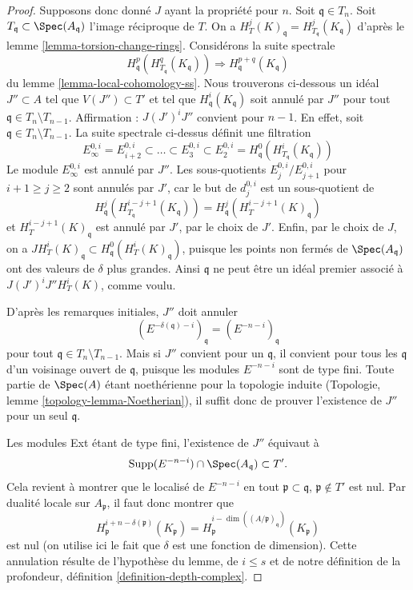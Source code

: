 \begin{proof}
\medskip\noindent
Supposons donc donné $J$ ayant la propriété pour $n$. Soit $\mathfrak q \in T_n$. Soit $T_\mathfrak q \subset \Spec(A_\mathfrak q)$ l'image réciproque de $T$. On a $H^j_T(K)_\mathfrak q = H^j_{T_\mathfrak q}(K_\mathfrak q)$ d'après le lemme \ref{lemma-torsion-change-rings}. Considérons la suite spectrale
$$
H_\mathfrak q^p(H^q_{T_\mathfrak q}(K_\mathfrak q))
\Rightarrow
H^{p + q}_\mathfrak q(K_\mathfrak q)
$$
du lemme \ref{lemma-local-cohomology-ss}. Nous trouverons ci-dessous un idéal $J'' \subset A$ tel que $V(J'') \subset T'$ et tel que $H^i_\mathfrak q(K_\mathfrak q)$ soit annulé par $J''$ pour tout $\mathfrak q \in T_n \setminus T_{n - 1}$. Affirmation : $J (J')^i J''$ convient pour $n - 1$. En effet, soit $\mathfrak q \in T_n \setminus T_{n - 1}$. La suite spectrale ci-dessus définit une filtration
$$
E_\infty^{0, i} = E_{i + 2}^{0, i} \subset \ldots \subset E_3^{0, i} \subset
E_2^{0, i} = H^0_\mathfrak q(H^i_{T_\mathfrak q}(K_\mathfrak q))
$$
Le module $E_\infty^{0, i}$ est annulé par $J''$. Les sous-quotients $E_j^{0, i}/E_{j + 1}^{0, i}$ pour $i + 1 \geq j \geq 2$ sont annulés par $J'$, car le but de $d_j^{0, i}$ est un sous-quotient de
$$
H^j_\mathfrak q(H^{i - j + 1}_{T_\mathfrak q}(K_\mathfrak q)) =
H^j_\mathfrak q(H^{i - j + 1}_T(K)_\mathfrak q)
$$
et $H^{i - j + 1}_T(K)_\mathfrak q$ est annulé par $J'$, par le choix de $J'$. Enfin, par le choix de $J$, on a $J H^i_T(K)_\mathfrak q \subset H^0_\mathfrak q(H^i_T(K)_\mathfrak q)$, puisque les points non fermés de $\Spec(A_\mathfrak q)$ ont des valeurs de $\delta$ plus grandes. Ainsi $\mathfrak q$ ne peut être un idéal premier associé à $J(J')^iJ'' H^i_T(K)$, comme voulu.

\medskip\noindent
D'après les remarques initiales, $J''$ doit annuler
$$
(E^{-\delta(\mathfrak q) - i})_\mathfrak q =
(E^{-n - i})_\mathfrak q
$$
pour tout $\mathfrak q \in T_n \setminus T_{n - 1}$. Mais si $J''$ convient pour un $\mathfrak q$, il convient pour tous les $\mathfrak q$ d'un voisinage ouvert de $\mathfrak q$, puisque les modules $E^{-n - i}$ sont de type fini. Toute partie de $\Spec(A)$ étant noethérienne pour la topologie induite (Topologie, lemme \ref{topology-lemma-Noetherian}), il suffit donc de prouver l'existence de $J''$ pour un seul $\mathfrak q$.

\medskip\noindent
Les modules Ext étant de type fini, l'existence de $J''$ équivaut à
$$
\text{Supp}(E^{-n - i}) \cap \Spec(A_\mathfrak q) \subset T'.
$$
Cela revient à montrer que le localisé de $E^{-n - i}$ en tout $\mathfrak p \subset \mathfrak q$, $\mathfrak p \not \in T'$ est nul. Par dualité locale sur $A_\mathfrak p$, il faut donc montrer que
$$
H^{i + n - \delta(\mathfrak p)}_\mathfrak p(K_\mathfrak p) =
H^{i - \dim((A/\mathfrak p)_\mathfrak q)}_\mathfrak p(K_\mathfrak p)
$$
est nul (on utilise ici le fait que $\delta$ est une fonction de dimension). Cette annulation résulte de l'hypothèse du lemme, de $i \leq s$ et de notre définition de la profondeur, définition \ref{definition-depth-complex}.


\end{proof}
